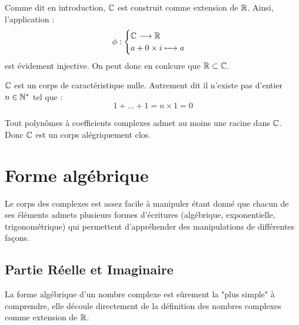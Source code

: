 \begin{remark}
    Comme dit en introduction, $\mathbb{C}$ est construit comme extension de $\mathbb{R}$. 
    Ainsi, l'application : 
        \[ \phi : 
            \begin{cases}
                \mathbb{C} \longrightarrow \mathbb{R} \\ 
                a + 0 \times i \longmapsto a 
            \end{cases} \]
    est évidement injective. On peut donc en conlcure que $\mathbb{R} \subset \mathbb{C}$. 
\end{remark}

\begin{proposition}
    $\mathbb{C}$ est un corps de caractéristique nulle. Autrement dit il n'existe pas d'entier $ n \in \mathbb{N}^*$ tel que :
        \[ 1 + \dots + 1 = n \times 1 = 0 \]
\end{proposition}


\begin{theorem}
    Tout polynômes à coefficients complexes admet au moins une racine dans $\mathbb{C}$. 
    Donc $\mathbb{C}$ est un corps alégriquement clos.
\end{theorem}



\section{Forme algébrique}

Le corps des complexes est assez facile à manipuler étant donné que chacun de ses éléments admets plusieurs formes 
d'écritures (algébrique, exponentielle, trigonométrique) qui permettent d'appréhender des manipulations de différentes 
façons. 

\subsection{Partie Réelle et Imaginaire}

La forme algébrique d'un nombre complexe est sûrement la "plus simple" à comprendre, elle découle directement de 
la définition des nombres complexes comme extension de $\mathbb{R}$. 

\newpage

